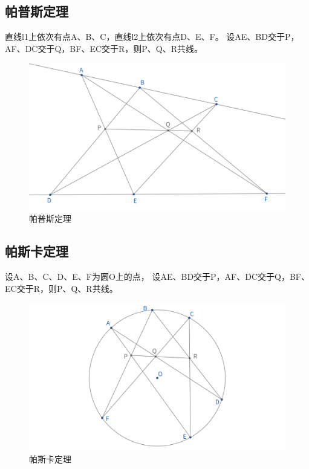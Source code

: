 \subsection{帕普斯定理}
\begin{theorem}
直线l1上依次有点A、B、C，直线l2上依次有点D、E、F。
设AE、BD交于P，AF、DC交于Q，BF、EC交于R，则P、Q、R共线。
\end{theorem}
\begin{figure}[htbp]
    \centering
    \includegraphics[width=\linewidth]{figures/帕普斯定理.png}
    \caption{帕普斯定理}
\end{figure}


\newpage
\subsection{帕斯卡定理}
\begin{theorem}
设A、B、C、D、E、F为圆O上的点，
设AE、BD交于P，AF、DC交于Q，BF、EC交于R，则P、Q、R共线。
\end{theorem}
\begin{figure}[htbp]
    \centering
    \includegraphics[width=\linewidth]{figures/帕斯卡定理.png}
    \caption{帕斯卡定理}
\end{figure}


